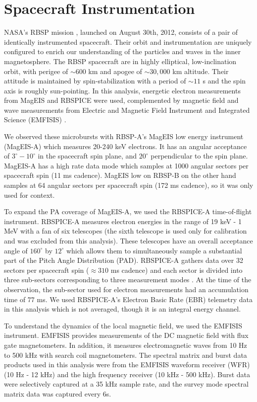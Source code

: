 \section{Spacecraft Instrumentation} \label{sc} %
NASA's RBSP mission \citep{Mauk2013}, launched on August 30th, 2012, consists of a pair of identically instrumented spacecraft. Their orbit and instrumentation are uniquely configured to enrich our understanding of the particles and waves in the inner magnetosphere. The RBSP spacecraft are in highly elliptical, low-inclination orbit, with perigee of ${\sim}600$ km and apogee of ${\sim}30,000$ km altitude. Their attitude is maintained by spin-stabilization with a period of ${\sim}11$ s and the spin axis is roughly sun-pointing. In this analysis, energetic electron measurements from MagEIS \citep{Blake2013} and RBSPICE \citep{Mitchell2013} were used, complemented by magnetic field and wave measurements from Electric and Magnetic Field Instrument and Integrated Science (EMFISIS) \citep{Kletzing2013}.

We observed these microbursts with RBSP-A's MagEIS low energy instrument (MagEIS-A) which measures 20-240 keV electrons. It has an angular acceptance of $3^\circ - 10^\circ$ in the spacecraft spin plane, and $20^\circ$ perpendicular to the spin plane. MagEIS-A has a high rate data mode which samples at 1000 angular sectors per spacecraft spin (11 ms cadence). MagEIS low on RBSP-B on the other hand samples at 64 angular sectors per spacecraft spin (172 ms cadence), so it was only used for context.

To expand the PA coverage of MagEIS-A, we used the RBSPICE-A time-of-flight instrument. RBSPICE-A measures electron energies in the range of 19 keV - 1 MeV with a fan of six telescopes (the sixth telescope is used only for calibration and was excluded from this analysis). These telescopes have an overall acceptance angle of $160^\circ$ by $12^\circ$ which allows them to simultaneously sample a substantial part of the Pitch Angle Distribution (PAD). RBSPICE-A gathers data over 32 sectors per spacecraft spin ($\approx 310$ ms cadence) and each sector is divided into three sub-sectors corresponding to three measurement modes \citep{Manweiler2018}. At the time of the observation, the sub-sector used for electron measurements had an accumulation time of $77$ ms. We used RBSPICE-A's Electron Basic Rate (EBR) telemetry data in this analysis which is not averaged, though it is an integral energy channel.

To understand the dynamics of the local magnetic field, we used the EMFISIS instrument. EMFISIS provides measurements of the DC magnetic field with flux gate magnetometers. In addition, it measures electromagnetic waves from 10 Hz to 500 kHz with search coil magnetometers. The spectral matrix and burst data products used in this analysis were from the EMFISIS waveform receiver (WFR) (10 Hz - 12 kHz) and the high frequency receiver (10 kHz - 500 kHz). Burst data were selectively captured at a 35 kHz sample rate, and the survey mode spectral matrix data was captured every 6s.

